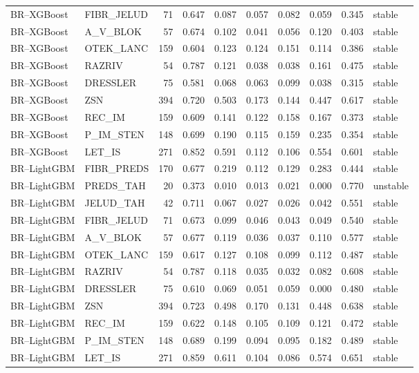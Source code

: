 \begin{longtable}{llrrrrrrrl}
BR--XGBoost & FIBR\_JELUD & 71 & 0.647 & 0.087 & 0.057 & 0.082 & 0.059 & 0.345 & stable \\
BR--XGBoost & A\_V\_BLOK & 57 & 0.674 & 0.102 & 0.041 & 0.056 & 0.120 & 0.403 & stable \\
BR--XGBoost & OTEK\_LANC & 159 & 0.604 & 0.123 & 0.124 & 0.151 & 0.114 & 0.386 & stable \\
BR--XGBoost & RAZRIV & 54 & 0.787 & 0.121 & 0.038 & 0.038 & 0.161 & 0.475 & stable \\
BR--XGBoost & DRESSLER & 75 & 0.581 & 0.068 & 0.063 & 0.099 & 0.038 & 0.315 & stable \\
BR--XGBoost & ZSN & 394 & 0.720 & 0.503 & 0.173 & 0.144 & 0.447 & 0.617 & stable \\
BR--XGBoost & REC\_IM & 159 & 0.609 & 0.141 & 0.122 & 0.158 & 0.167 & 0.373 & stable \\
BR--XGBoost & P\_IM\_STEN & 148 & 0.699 & 0.190 & 0.115 & 0.159 & 0.235 & 0.354 & stable \\
BR--XGBoost & LET\_IS & 271 & 0.852 & 0.591 & 0.112 & 0.106 & 0.554 & 0.601 & stable \\
BR--LightGBM & FIBR\_PREDS & 170 & 0.677 & 0.219 & 0.112 & 0.129 & 0.283 & 0.444 & stable \\
BR--LightGBM & PREDS\_TAH & 20 & 0.373 & 0.010 & 0.013 & 0.021 & 0.000 & 0.770 & unstable \\
BR--LightGBM & JELUD\_TAH & 42 & 0.711 & 0.067 & 0.027 & 0.026 & 0.042 & 0.551 & stable \\
BR--LightGBM & FIBR\_JELUD & 71 & 0.673 & 0.099 & 0.046 & 0.043 & 0.049 & 0.540 & stable \\
BR--LightGBM & A\_V\_BLOK & 57 & 0.677 & 0.119 & 0.036 & 0.037 & 0.110 & 0.577 & stable \\
BR--LightGBM & OTEK\_LANC & 159 & 0.617 & 0.127 & 0.108 & 0.099 & 0.112 & 0.487 & stable \\
BR--LightGBM & RAZRIV & 54 & 0.787 & 0.118 & 0.035 & 0.032 & 0.082 & 0.608 & stable \\
BR--LightGBM & DRESSLER & 75 & 0.610 & 0.069 & 0.051 & 0.059 & 0.000 & 0.480 & stable \\
BR--LightGBM & ZSN & 394 & 0.723 & 0.498 & 0.170 & 0.131 & 0.448 & 0.638 & stable \\
BR--LightGBM & REC\_IM & 159 & 0.622 & 0.148 & 0.105 & 0.109 & 0.121 & 0.472 & stable \\
BR--LightGBM & P\_IM\_STEN & 148 & 0.689 & 0.199 & 0.094 & 0.095 & 0.182 & 0.489 & stable \\
BR--LightGBM & LET\_IS & 271 & 0.859 & 0.611 & 0.104 & 0.086 & 0.574 & 0.651 & stable \\

\end{longtable}
